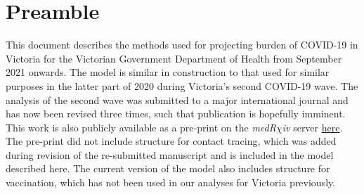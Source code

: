 \section{Preamble}
This document describes the methods used for projecting burden of COVID-19 in Victoria for the Victorian Government Department of Health from September 2021 onwards.
The model is similar in construction to that used for similar purposes in the latter part of 2020 during Victoria's second COVID-19 wave.
The analysis of the second wave was submitted to a major international journal and has now been revised three times, such that publication is hopefully imminent.
This work is also publicly available as a pre-print on the \textit{medR\(\chi\)iv} server \href{https://www.medrxiv.org/content/10.1101/2021.04.03.21254866v2}{here}.
The pre-print did not include structure for contact tracing, which was added during revision of the re-submitted manuscript and is included in the model described here.
The current version of the model also includes structure for vaccination, which has not been used in our analyses for Victoria previously.